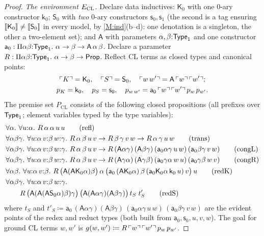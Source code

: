 \begin{proof}
\emph{The environment $E_{\mathrm{CL}}$.}  Declare data
inductives: $\mathsf{K}_0$ with one $0$-ary constructor
$\mathsf{k}_0$; $\mathsf{S}_0$ with \emph{two} $0$-ary constructors
$\mathsf{s}_0, \mathsf{s}_1$ (the second is a tag ensuring
$[\![ \mathsf{K}_0 ]\!] \neq [\![ \mathsf{S}_0 ]\!]$ in every model, by
\ref{M:ind}(b--d): one denotation is a singleton, the other a
two-element set); and $\mathsf{A}$ with parameters $\alpha,
\beta{:}\mathsf{Type}_1$ and one constructor $\mathsf{a}_0 : \Pi
\alpha\beta{:}\mathsf{Type}_1.\ \alpha \to \beta \to
\mathsf{A}\,\alpha\,\beta$.  Declare a parameter
$R : \Pi \alpha\beta{:}\mathsf{Type}_1.\ \alpha \to \beta \to \mathsf{Prop}$.
Reflect CL terms as closed types and canonical points:
\begin{gather*}
  \ulcorner K \urcorner = \mathsf{K}_0,\quad
  \ulcorner S \urcorner = \mathsf{S}_0,\quad
  \ulcorner w\,w' \urcorner = \mathsf{A}\,\ulcorner w \urcorner\,\ulcorner w' \urcorner;\\
  p_K = \mathsf{k}_0,\quad
  p_S = \mathsf{s}_0,\quad
  p_{w\,w'} = \mathsf{a}_0\,\ulcorner w \urcorner\,\ulcorner w' \urcorner\,p_w\,p_{w'} .
\end{gather*}
The premise set $P_{\mathrm{CL}}$ consists of the following closed
propositions (all prefixes over $\mathsf{Type}_1$; element variables typed
by the type variables):
\begin{align}
& \forall \alpha.\ \forall u{:}\alpha.\ R\,\alpha\,\alpha\,u\,u
  \tag{refl}\\
& \forall \alpha\beta\gamma.\ \forall u{:}\alpha\, v{:}\beta\,
  w{:}\gamma.\ R\,\alpha\,\beta\,u\,v \to R\,\beta\,\gamma\,v\,w \to
  R\,\alpha\,\gamma\,u\,w
  \tag{trans}\\
& \forall \alpha\beta\gamma.\ \forall u{:}\alpha\, v{:}\beta\,
  w{:}\gamma.\ R\,\alpha\,\beta\,u\,v \to
  R\,(\mathsf{A}\alpha\gamma)\,(\mathsf{A}\beta\gamma)\,
    (\mathsf{a}_0\alpha\gamma\,u\,w)\,(\mathsf{a}_0\beta\gamma\,v\,w)
  \tag{congL}\\
& \forall \alpha\beta\gamma.\ \forall u{:}\alpha\, v{:}\beta\,
  w{:}\gamma.\ R\,\alpha\,\beta\,u\,v \to
  R\,(\mathsf{A}\gamma\alpha)\,(\mathsf{A}\gamma\beta)\,
    (\mathsf{a}_0\gamma\alpha\,w\,u)\,(\mathsf{a}_0\gamma\beta\,w\,v)
  \tag{congR}\\
& \forall \alpha\beta.\ \forall u{:}\alpha\, v{:}\beta.\
  R\,\bigl(\mathsf{A}(\mathsf{A}\mathsf{K}_0\alpha)\beta\bigr)\,
    \alpha\,
    \bigl(\mathsf{a}_0\,(\mathsf{A}\mathsf{K}_0\alpha)\,\beta\,
      (\mathsf{a}_0\mathsf{K}_0\alpha\,\mathsf{k}_0\,u)\,v\bigr)\,
    u
  \tag{redK}\\
& \forall \alpha\beta\gamma.\ \forall u{:}\alpha\, v{:}\beta\,
  w{:}\gamma. \notag\\
& \qquad
  R\,\bigl(\mathsf{A}(\mathsf{A}(\mathsf{A}\mathsf{S}_0\alpha)\beta)\gamma\bigr)\,
    \bigl(\mathsf{A}(\mathsf{A}\alpha\gamma)(\mathsf{A}\beta\gamma)\bigr)\,
    t_S\; t'_S
  \tag{redS}
\end{align}
where $t_S$ and $t'_S \coloneqq
\mathsf{a}_0\,(\mathsf{A}\alpha\gamma)(\mathsf{A}\beta\gamma)\,
(\mathsf{a}_0\alpha\gamma\,u\,w)\,(\mathsf{a}_0\beta\gamma\,v\,w)$
are the evident points of the redex and reduct types (both built
from $\mathsf{a}_0, \mathsf{s}_0, u, v, w$).  The goal for ground CL
terms $w, w'$ is $g(w, w') \coloneqq
R\,\ulcorner w \urcorner\,\ulcorner w' \urcorner\,p_w\,p_{w'}$.


\end{proof}
